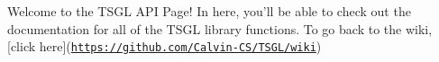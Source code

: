 \-Welcome to the \-T\-S\-G\-L \-A\-P\-I \-Page! \-In here, you'll be able to check out the documentation for all of the \-T\-S\-G\-L library functions. \-To go back to the wiki, \mbox{[}click here\mbox{]}(\href{https://github.com/Calvin-CS/TSGL/wiki}{\tt https\-://github.\-com/\-Calvin-\/\-C\-S/\-T\-S\-G\-L/wiki})